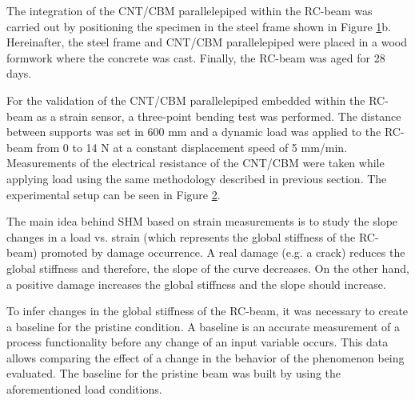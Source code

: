 \documentclass[twocolumn]{bmcart}%
\begin{document}
The integration of the CNT/CBM parallelepiped within the RC-beam was carried out by positioning the specimen in the steel frame shown in Figure \ref{fig5}b. Hereinafter, the steel frame and CNT/CBM parallelepiped were placed in a wood formwork where the concrete was cast. Finally, the RC-beam was aged for 28 days. 

\begin{figure}[h!]
  \caption{
      }
      \label{fig5}
      \end{figure}


For the validation of the CNT/CBM parallelepiped embedded within the RC-beam as a strain sensor, a three-point bending test was performed. The distance between supports was set in 600 mm and a dynamic load was applied to the RC-beam from 0 to 14 N at a constant displacement speed of 5 mm/min. Measurements of the electrical resistance of the CNT/CBM were taken while applying load using the same methodology described in previous section. The experimental setup can be seen in Figure \ref{fig6}.

The main idea behind SHM based on strain measurements is to study the slope changes in a load vs. strain (which represents the global stiffness of the RC-beam) promoted by damage occurrence. A real damage (e.g. a crack) reduces the global stiffness and therefore, the slope of the curve decreases. On the other hand, a positive damage increases the global stiffness and the slope should increase.

To infer changes in the global stiffness of the RC-beam, it was necessary to create a baseline for the pristine condition. A baseline is an accurate measurement of a process functionality before any change of an input variable occurs. This data allows comparing the effect of a change in the behavior of the phenomenon being evaluated.  The baseline for the pristine beam was built by using the aforementioned load conditions.

\begin{figure}[h!]
  \caption{
      }
      \label{fig6}
      \end{figure}
\end{document}

